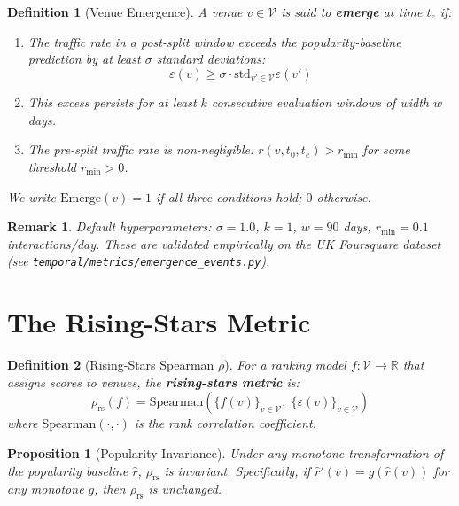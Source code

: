 \documentclass[11pt]{article}
\newtheorem{definition}{Definition}
\newtheorem{remark}{Remark}
\newtheorem{proposition}{Proposition}
\begin{document}
\begin{definition}[Venue Emergence]
A venue $v \in \mathcal{V}$ is said to \textbf{emerge} at time $t_e$ if:
\begin{enumerate}
    \item The traffic rate in a post-split window exceeds the popularity-baseline
          prediction by at least $\sigma$ standard deviations:
          \begin{equation}
              \varepsilon(v) \geq \sigma \cdot \text{std}_{v' \in \mathcal{V}} \varepsilon(v')
          \end{equation}
    \item This excess persists for at least $k$ consecutive evaluation windows
          of width $w$ days.
    \item The pre-split traffic rate is non-negligible:
          $r(v, t_0, t_e) > r_{\min}$ for some threshold $r_{\min} > 0$.
\end{enumerate}
We write $\text{Emerge}(v) = 1$ if all three conditions hold; $0$ otherwise.
\end{definition}

\begin{remark}
Default hyperparameters: $\sigma = 1.0$, $k = 1$, $w = 90$ days,
$r_{\min} = 0.1$ interactions/day.
These are validated empirically on the UK Foursquare dataset
(see \texttt{temporal/metrics/emergence\_events.py}).
\end{remark}

\section{The Rising-Stars Metric}

\begin{definition}[Rising-Stars Spearman $\rho$]
For a ranking model $f : \mathcal{V} \to \mathbb{R}$ that assigns scores to venues,
the \textbf{rising-stars metric} is:
\begin{equation}
    \rho_{\text{rs}}(f) = \text{Spearman}\!\left(\{f(v)\}_{v \in \mathcal{V}},\;
    \{\varepsilon(v)\}_{v \in \mathcal{V}}\right)
\end{equation}
where $\text{Spearman}(\cdot, \cdot)$ is the rank correlation coefficient.
\end{definition}

\begin{proposition}[Popularity Invariance]
Under any monotone transformation of the popularity baseline $\hat{r}$,
$\rho_{\text{rs}}$ is invariant. Specifically, if $\hat{r}'(v) = g(\hat{r}(v))$
for any monotone $g$, then $\rho_{\text{rs}}$ is unchanged.
\end{proposition}
\end{document}

